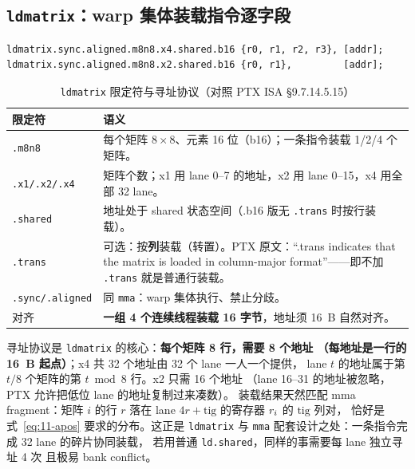 \subsection{\texttt{ldmatrix}：warp 集体装载指令逐字段}

\begin{lstlisting}[language={}]
ldmatrix.sync.aligned.m8n8.x4.shared.b16 {r0, r1, r2, r3}, [addr];
ldmatrix.sync.aligned.m8n8.x2.shared.b16 {r0, r1},         [addr];
\end{lstlisting}

\begin{table}[htbp]
\centering
\caption{\texttt{ldmatrix} 限定符与寻址协议（对照 PTX ISA §9.7.14.5.15）}
\label{tab:11-ldm-fields}
\begin{tabular}{lp{10.6cm}}
\toprule
限定符 & 语义 \\
\midrule
\texttt{.m8n8} & 每个矩阵 $8\times8$、元素 16 位（b16）；一条指令装载 1/2/4 个矩阵。 \\
\texttt{.x1/.x2/.x4} & 矩阵个数；x1 用 lane 0--7 的地址，x2 用 lane 0--15，x4 用全部 32 lane。 \\
\texttt{.shared} & 地址处于 shared 状态空间（.b16 版无 \texttt{.trans} 时按行装载）。 \\
\texttt{.trans} & 可选：按\textbf{列}装载（转置）。PTX 原文：``.trans indicates that the matrix is loaded in column-major format''——即不加 \texttt{.trans} 就是普通行装载。 \\
\texttt{.\allowbreak{}sync/\allowbreak{}.\allowbreak{}aligned} & 同 \texttt{mma}：warp 集体执行、禁止分歧。 \\
对齐 & \textbf{一组 4 个连续线程装载 16 字节}，地址须 16~B 自然对齐。 \\
\bottomrule
\end{tabular}
\end{table}

寻址协议是 \texttt{ldmatrix} 的核心：\textbf{每个矩阵 8 行，需要 8 个地址
（每地址是一行的 16~B 起点）}；x4 共 32 个地址由 32 个 lane 一人一个提供，
lane $t$ 的地址属于第 $t/8$ 个矩阵的第 $t\bmod 8$ 行。x2 只需 16 个地址
（lane 16--31 的地址被忽略，PTX 允许把低位 lane 的地址复制过来凑数）。
装载结果天然匹配 mma fragment：矩阵 $i$ 的行 $r$ 落在
lane $4r + \mathrm{tig}$ 的寄存器 $r\sb i$ 的 $\mathrm{tig}$ 列对，
恰好是式~\ref{eq:11-apos} 要求的分布。这正是 \texttt{ldmatrix} 与
\texttt{mma} 配套设计之处：一条指令完成 32 lane 的碎片协同装载，
若用普通 \texttt{ld.shared}，同样的事需要每 lane 独立寻址 4 次
且极易 bank conflict。

